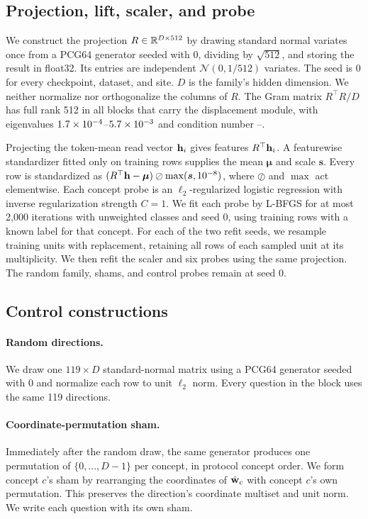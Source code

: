 \documentclass[11pt]{article}
\begin{document}
\subsection{Projection, lift, scaler, and probe}
\label{app:repro-probe}

We construct the projection $R\in\mathbb{R}^{D\times512}$ by drawing standard normal variates once from a PCG64 generator seeded with $0$, dividing by $\sqrt{512}$, and storing the result in float32. Its entries are independent $\mathcal{N}(0,1/512)$ variates. The seed is $0$ for every checkpoint, dataset, and site. $D$ is the family's hidden dimension. We neither normalize nor orthogonalize the columns of $R$. The Gram matrix $R^{\top}R/D$ has full rank 512 in all \cfAltdirdBlocks{} blocks that carry the displacement module, with eigenvalues $1.7\times10^{-4}$--$5.7\times10^{-3}$ and condition number \cfAltdirdCondMin{}--\cfAltdirdCondMax{}.

Projecting the token-mean read vector $\mathbf{h}_i$ gives features $R^{\top}\mathbf{h}_i$. A featurewise standardizer fitted only on training rows supplies the mean $\boldsymbol\mu$ and scale $\boldsymbol s$. Every row is standardized as $(R^{\top}\mathbf{h}-\boldsymbol\mu)\oslash\max(\boldsymbol s,10^{-8})$, where $\oslash$ and $\max$ act elementwise. Each concept probe is an $\ell_2$-regularized logistic regression with inverse regularization strength $C=1$. We fit each probe by L-BFGS for at most 2{,}000 iterations with unweighted classes and seed $0$, using training rows with a known label for that concept. For each of the two refit seeds, we resample training units with replacement, retaining all rows of each sampled unit at its multiplicity. We then refit the scaler and six probes using the same projection. The random family, shams, and control probes remain at seed 0.

\subsection{Control constructions}
\label{app:repro-controls}

\paragraph{Random directions.} We draw one $119\times D$ standard-normal matrix using a PCG64 generator seeded with $0$ and normalize each row to unit $\ell_2$ norm. Every question in the block uses the same 119 directions.

\paragraph{Coordinate-permutation sham.} Immediately after the random draw, the same generator produces one permutation of $\{0,\dots,D{-}1\}$ per concept, in protocol concept order. We form concept $c$'s sham by rearranging the coordinates of $\hat{\mathbf{w}}_c$ with concept $c$'s own permutation. This preserves the direction's coordinate multiset and unit norm. We write each question with its own sham.
\end{document}
